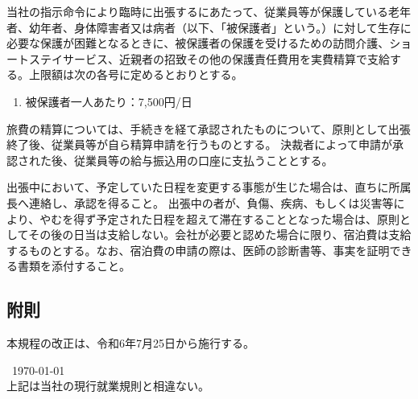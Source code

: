 \documentclass[10pt,a4paper,uplatex]{jsarticle}
\begin{document}
当社の指示命令により臨時に出張するにあたって、従業員等が保護している老年者、幼年者、身体障害者又は病者（以下、「被保護者」という。）に対して生存に必要な保護が困難となるときに、被保護者の保護を受けるための訪問介護、ショートステイサービス、近親者の招致その他の保護責任費用を実費精算で支給する。上限額は次の各号に定めるとおりとする。
\begin{enumerate}
    \item 被保護者一人あたり：7,500円/日
\end{enumerate}

旅費の精算については、手続きを経て承認されたものについて、原則として出張終了後、従業員等が自ら精算申請を行うものとする。
\term 決裁者によって申請が承認された後、従業員等の給与振込用の口座に支払うこととする。

出張中において、予定していた日程を変更する事態が生じた場合は、直ちに所属長へ連絡し、承認を得ること。
\term 出張中の者が、負傷、疾病、もしくは災害等により、やむを得ず予定された日程を超えて滞在することとなった場合は、原則としてその後の日当は支給しない。会社が必要と認めた場合に限り、宿泊費は支給するものとする。なお、宿泊費の申請の際は、医師の診断書等、事実を証明できる書類を添付すること。

\subsection*{附則}
本規程の改正は、令和6年7月25日から施行する。

\begin{flushleft}\
\today\\
\vspace{10pt}
上記は当社の現行就業規則と相違ない。\\
\vspace{10pt}
\MakeSignatureField
\end{flushleft}
\end{document}
